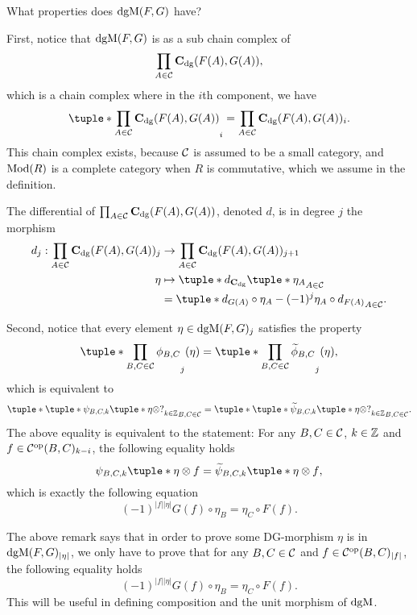 \begin{remark}
    What properties does \( \operatorname{dgM}(F, G) \) have?

    First, notice that \( \operatorname{dgM}(F, G) \) is as a sub chain complex of
    \[
        \prod_{A \in {\mathcal{C}}} \operatorname{\mathbf{C}}_{\operatorname{dg}}(F(A), G(A)),
    \]
    which is a chain complex where in the \( i \)th component, we have
    \[
        \tuple*{ \prod_{A \in \Cc} \C_{\dg}(F(A), G(A)) }_i = \prod_{A \in \Cc} \C_{\dg}(F(A), G(A))_i.
    \]
    This chain complex exists, because \( {\mathcal{C}} \) is assumed to be a small category, and \( \operatorname{Mod}(R) \) is a complete category when \( R \) is commutative, which we assume in the definition.

    The differential of \( \prod_{A \in {\mathcal{C}}} \operatorname{\mathbf{C}}_{\operatorname{dg}}(F(A), G(A)) \), denoted \( d \), is in degree \( j \) the morphism
    \begin{align*}
        d_j: \prod_{A \in \Cc} \C_{\dg}(F(A), G(A))_j &\to \prod_{A \in \Cc} \C_{\dg}(F(A), G(A))_{j + 1} \\
        \eta &\mapsto \tuple*{ d_{\C_{\dg}}\tuple*{ \eta_A } }_{A \in \Cc} \\
        &= \tuple*{ d_{G(A)} \circ \eta_A - (-1)^j \eta_A \circ d_{F(A)} }_{A \in \Cc}.
    \end{align*}

    Second, notice that every element \( \eta \in \operatorname{dgM}(F, G)_j \) satisfies the property
    \[
        \tuple*{ \prod\limits_{B, C \in \Cc} \phi_{B, C} }_j (\eta) = \tuple*{ \prod_{B, C \in \Cc} \widetilde{\phi}_{B, C} }_j (\eta),
    \]
    which is equivalent to
    \[
        \tuple*{ \tuple*{ \psi_{B, C, k}\tuple*{ \eta \otimes ? } }_{k \in \Zb} }_{B, C \in \Cc} = \tuple*{ \tuple*{ \widetilde{\psi}_{B, C, k}\tuple*{ \eta \otimes ? } }_{k \in \Zb} }_{B, C \in \Cc}.
    \]
    The above equality is equivalent to the statement: For any \( B, C \in {\mathcal{C}} \), \( k \in {\mathbb{Z}} \) and \( f \in {\mathcal{C}}^{\operatorname{op}}(B, C)_{k - i} \), the following equality holds
    \[
        \psi_{B, C, k}\tuple*{ \eta \otimes f } = \widetilde{\psi}_{B, C, k} \tuple*{ \eta \otimes f },
    \]
    which is exactly the following equation
    \[
        (-1)^{|f||\eta|}G(f) \circ \eta_{B} = \eta_{C} \circ F(f).
    \]
\end{remark}

The above remark says that in order to prove some DG-morphism \( \eta \) is in \( \operatorname{dgM}(F, G)_{|\eta|} \), we only have to prove that for any \( B, C \in {\mathcal{C}} \) and \( f \in {\mathcal{C}}^{\operatorname{op}}(B, C)_{|f|} \), the following equality holds
\[
        (-1)^{|f||\eta|}G(f) \circ \eta_{B} = \eta_{C} \circ F(f).
\]
This will be useful in defining composition and the unit morphism of \( \operatorname{dgM} \).

